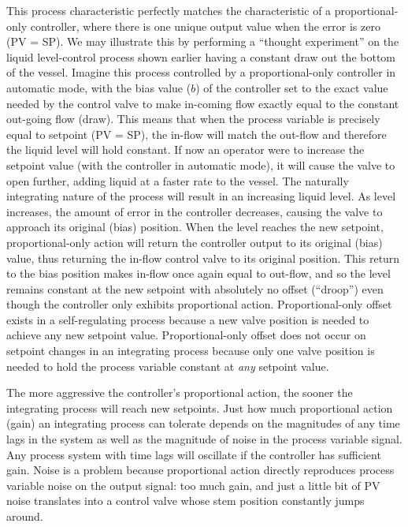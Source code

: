 This process characteristic perfectly matches the characteristic of a proportional-only controller, where there is one unique output value when the error is zero (PV = SP).  We may illustrate this by performing a ``thought experiment'' on the liquid level-control process shown earlier having a constant draw out the bottom of the vessel.  Imagine this process controlled by a proportional-only controller in automatic mode, with the bias value ($b$) of the controller set to the exact value needed by the control valve to make in-coming flow exactly equal to the constant out-going flow (draw).  This means that when the process variable is precisely equal to setpoint (PV = SP), the in-flow will match the out-flow and therefore the liquid level will hold constant.  If now an operator were to increase the setpoint value (with the controller in automatic mode), it will cause the valve to open further, adding liquid at a faster rate to the vessel.  The naturally integrating nature of the process will result in an increasing liquid level.  As level increases, the amount of error in the controller decreases, causing the valve to approach its original (bias) position.  When the level reaches the new setpoint, proportional-only action will return the controller output to its original (bias) value, thus returning the in-flow control valve to its original position.  This return to the bias position makes in-flow once again equal to out-flow, and so the level remains constant at the new setpoint with absolutely no offset (``droop'') even though the controller only exhibits proportional action.  Proportional-only offset exists in a self-regulating process because a new valve position is needed to achieve any new setpoint value.  Proportional-only offset does not occur on setpoint changes in an integrating process because only one valve position is needed to hold the process variable constant at \textit{any} setpoint value.    

The more aggressive the controller's proportional action, the sooner the integrating process will reach new setpoints.  Just how much proportional action (gain) an integrating process can tolerate depends on the magnitudes of any time lags in the system as well as the magnitude of noise in the process variable signal.  Any process system with time lags will oscillate if the controller has sufficient gain.  Noise is a problem because proportional action directly reproduces process variable noise on the output signal: too much gain, and just a little bit of PV noise translates into a control valve whose stem position constantly jumps around.

